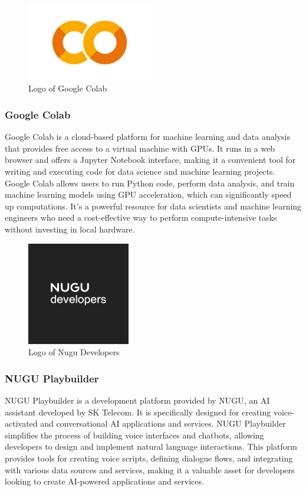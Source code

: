 \documentclass[conference]{IEEEtran}
\begin{document}
        \begin{figure}[htbp]
        \centerline{\includegraphics[width=5.5cm]{Images/logo/colab.png}}
        \label{fig}
        \caption{Logo of Google Colab}
        \end{figure}
        \subsubsection{Google Colab}
        Google Colab is a cloud-based platform for machine learning and data analysis that provides free access to a virtual machine with GPUs. It runs in a web browser and offers a Jupyter Notebook interface, making it a convenient tool for writing and executing code for data science and machine learning projects. Google Colab allows users to run Python code, perform data analysis, and train machine learning models using GPU acceleration, which can significantly speed up computations. It's a powerful resource for data scientists and machine learning engineers who need a cost-effective way to perform compute-intensive tasks without investing in local hardware.\\

        \begin{figure}[htbp]
        \centerline{\includegraphics[width=4.5cm]{Images/logo/nugu.png}}
        \label{fig}
        \caption{Logo of Nugu Developers}
        \end{figure}
        \subsubsection{NUGU Playbuilder}
        NUGU Playbuilder is a development platform provided by NUGU, an AI assistant developed by SK Telecom. It is specifically designed for creating voice-activated and conversational AI applications and services. NUGU Playbuilder simplifies the process of building voice interfaces and chatbots, allowing developers to design and implement natural language interactions. This platform provides tools for creating voice scripts, defining dialogue flows, and integrating with various data sources and services, making it a valuable asset for developers looking to create AI-powered applications and services.\\
\end{document}
